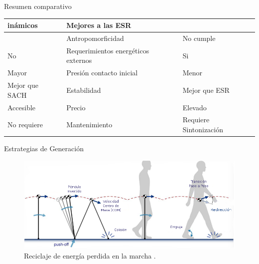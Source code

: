 \documentclass[10pt]{beamer}
\begin{document}
\begin{frame}{Resumen comparativo}
\begin{table}
\begin{centering}
\begin{tabular}{|>{\centering}p{24mm}|>{\centering}p{45mm}|>{\centering}p{24mm}|}
inámicos} & {\footnotesize{}Mejores a las ESR}\tabularnewline
\hline 
{\footnotesize{}Cumple} & {\footnotesize{}Antropomorficidad} & {\footnotesize{}No cumple}\tabularnewline
\hline 
{\footnotesize{}No} & {\footnotesize{}Requerimientos energéticos externos} & {\footnotesize{}Si}\tabularnewline
\hline 
{\footnotesize{}Mayor} & {\footnotesize{}Presión contacto inicial} & {\footnotesize{}Menor}\tabularnewline
\hline 
{\footnotesize{}Mejor que SACH} & {\footnotesize{}Estabilidad} & {\footnotesize{}Mejor que ESR}\tabularnewline
\hline 
{\footnotesize{}Accesible} & {\footnotesize{}Precio} & {\footnotesize{}Elevado}\tabularnewline
\hline 
{\footnotesize{}No requiere} & {\footnotesize{}Mantenimiento} & {\footnotesize{}Requiere Sintonización}\tabularnewline
\hline 
\end{tabular}
\par\end{centering}


\end{table}

\end{frame}

\begin{frame}{Estrategias de Generación}

\begin{figure}
\begin{centering}
\includegraphics[scale=0.35]{Feathergraphics/transicion}
\par\end{centering}
\caption{Reciclaje de energía perdida en la marcha \cite{Collins2010}.}

\end{figure}
\end{frame}
\end{document}
